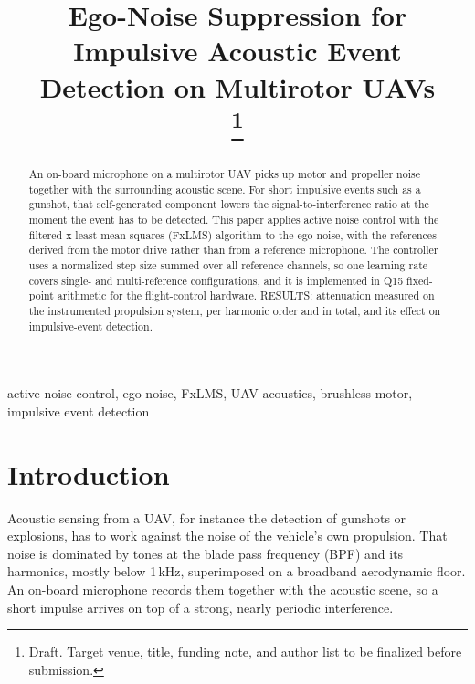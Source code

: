 \documentclass[conference]{IEEEtran}
\begin{document}
\title{Ego-Noise Suppression for Impulsive Acoustic Event Detection on Multirotor UAVs\\\thanks{Draft. Target venue, title, funding note, and author list to be finalized before submission.}}

\author{
}

\maketitle

\begin{abstract}
An on-board microphone on a multirotor UAV picks up motor and propeller noise together with the surrounding acoustic scene. For short impulsive events such as a gunshot, that self-generated component lowers the signal-to-interference ratio at the moment the event has to be detected. This paper applies active noise control with the filtered-x least mean squares (FxLMS) algorithm to the ego-noise, with the references derived from the motor drive rather than from a reference microphone. The controller uses a normalized step size summed over all reference channels, so one learning rate covers single- and multi-reference configurations, and it is implemented in Q15 fixed-point arithmetic for the flight-control hardware. RESULTS: attenuation measured on the instrumented propulsion system, per harmonic order and in total, and its effect on impulsive-event detection.
\end{abstract}

\begin{IEEEkeywords}
active noise control, ego-noise, FxLMS, UAV acoustics, brushless motor, impulsive event detection
\end{IEEEkeywords}

\section{Introduction}
\label{sec:intro}
Acoustic sensing from a UAV, for instance the detection of gunshots or explosions, has to work against the noise of the vehicle's own propulsion. That noise is dominated by tones at the blade pass frequency (BPF) and its harmonics, mostly below 1\,kHz, superimposed on a broadband aerodynamic floor. An on-board microphone records them together with the acoustic scene, so a short impulse arrives on top of a strong, nearly periodic interference.
\end{document}
